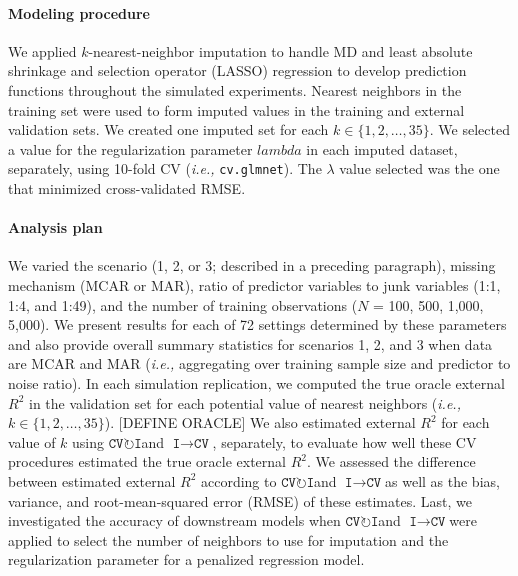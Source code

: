 \documentclass[AMA,STIX1COL,doublespace]{WileyNJD-v2}
\begin{document}
\paragraph{Modeling procedure}

We applied \(k\)-nearest-neighbor imputation to handle MD and least
absolute shrinkage and selection operator (LASSO) regression to develop
prediction functions throughout the simulated experiments. Nearest
neighbors in the training set were used to form imputed values in the
training and external validation sets. We created one imputed set for
each \(k \in \lbrace 1, 2, \ldots, 35\rbrace\). We selected a value for
the regularization parameter \(lambda\) in each imputed dataset,
separately, using 10-fold CV (\textit{i.e., }\texttt{cv.glmnet}). The
\(\lambda\) value selected was the one that minimized cross-validated
RMSE.

\paragraph{Analysis plan}

We varied the scenario (1, 2, or 3; described in a preceding paragraph),
missing mechanism (MCAR or MAR), ratio of predictor variables to junk
variables (1:1, 1:4, and 1:49), and the number of training observations
(\(N\) = 100, 500, 1,000, 5,000). We present results for each of 72
settings determined by these parameters and also provide overall summary
statistics for scenarios 1, 2, and 3 when data are MCAR and MAR
(\textit{i.e., }aggregating over training sample size and predictor to
noise ratio). In each simulation replication, we computed the true
oracle external \(R^2\) in the validation set for each potential value
of nearest neighbors
(\textit{i.e., }\(k \in \lbrace 1, 2, \ldots, 35 \rbrace\)). {[}DEFINE
ORACLE{]} We also estimated external \(R^2\) for each value of \(k\)
using $\texttt{CV}\!\circlearrowright\!\texttt{I}$\space and
$\texttt{I}\!\!\rightarrow\!\texttt{CV}$, separately, to evaluate how
well these CV procedures estimated the true oracle external \(R^2\). We
assessed the difference between estimated external \(R^2\) according to
$\texttt{CV}\!\circlearrowright\!\texttt{I}$\space and
$\texttt{I}\!\!\rightarrow\!\texttt{CV}$\space as well as the bias,
variance, and root-mean-squared error (RMSE) of these estimates. Last,
we investigated the accuracy of downstream models when
$\texttt{CV}\!\circlearrowright\!\texttt{I}$\space and
$\texttt{I}\!\!\rightarrow\!\texttt{CV}$\space were applied to select
the number of neighbors to use for imputation and the regularization
parameter for a penalized regression model.
\end{document}
